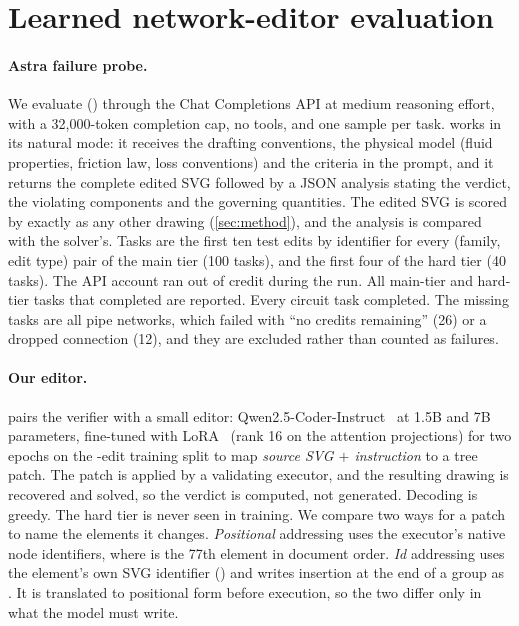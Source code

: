 \section{Learned network-editor evaluation}
\label{sec:experiments}

\paragraph{Astra failure probe.} We evaluate \astra () through the Chat Completions API at medium
reasoning effort, with a 32{,}000-token completion cap, no tools,  and one sample per task.
\astra works in its natural mode: it receives the drafting conventions, the physical model (fluid properties,
friction law, loss conventions) and the criteria in the prompt, and it returns the complete edited SVG followed
by a JSON analysis stating the verdict, the violating components and the governing quantities. The edited SVG
is scored by \ours exactly as any other drawing (\cref{sec:method}), and the analysis is compared with the
solver's. Tasks are the first ten test edits by identifier for every (family, edit type) pair of the main tier
(100 tasks), and the first four of the hard tier (40 tasks). The API account ran out of credit during the run.
All \astraMainN{} main-tier and \astraHardN{} hard-tier tasks that completed are reported. Every circuit task
completed. The missing tasks are all pipe networks, which failed with ``no credits remaining'' (26) or a
dropped connection (12), and they are excluded rather than counted as failures.

\paragraph{Our editor.} \ours pairs the verifier with a small editor: Qwen2.5-Coder-Instruct~\cite{hui2024qwen25coder}
at 1.5B and 7B parameters, fine-tuned with LoRA~\cite{hu2022lora} (rank 16 on the attention projections) for two
epochs on the \netEdits{}-edit training split to map \emph{source SVG $+$ instruction} to a tree patch. The patch
is applied by a validating executor, and the resulting drawing is recovered and solved, so the verdict is
computed, not generated. Decoding is greedy. The hard tier is never seen in training. We compare two ways for
a patch to name the elements it changes. \emph{Positional} addressing uses the executor's native node
identifiers, where  is the 77th element in document order. \emph{Id} addressing uses the element's own
SVG identifier () and writes insertion at the end of a group as . It is
translated to positional form before execution, so the two differ only in what the model must write.

